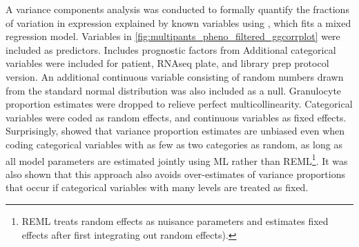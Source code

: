 \begin{outline}
\1 A variance components analysis was conducted to formally quantify the fractions of variation in expression explained by known variables
using \autocite{hoffman2016VariancePartitionInterpretingDrivers}, which fits a mixed regression model.
Variables in \autoref{fig:multipants_pheno_filtered_ggcorrplot} were included as predictors.
    \2 Includes prognostic factors from \autocite{kennedy2019PredictorsAntiTNFTreatment}
\1 Additional categorical variables were included for patient, \gls{RNAseq} plate, and library prep protocol version.
An additional continuous variable consisting of random numbers drawn from the standard normal distribution was also included as a null.
Granulocyte proportion estimates were dropped to relieve perfect multicollinearity.
Categorical variables were coded as random effects, and continuous variables as fixed effects.
Surprisingly, \textcite{hoffman2016VariancePartitionInterpretingDrivers} showed that variance proportion estimates are unbiased even when coding categorical variables with as few as two categories as random, 
as long as all model parameters are estimated jointly using \gls{ML} rather than \gls{REML}\footnote{
    \gls{REML} treats random effects as nuisance parameters and estimates fixed effects after first integrating out random effects).
}.
It was also shown that this approach also avoids over-estimates of variance proportions that occur if categorical variables with many levels are treated as fixed.


\end{outline}
